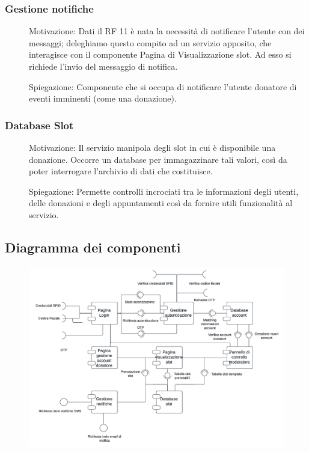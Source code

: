 \documentclass{article}
\begin{document}
\subsubsection{Gestione notifiche}
\begin{description}
	\item[] Motivazione: Dati il RF 11 è nata la necessità di notificare l'utente con dei messaggi; deleghiamo questo compito ad un servizio apposito, che interagisce con il componente Pagina di Visualizzazione slot. Ad esso si richiede l'invio del messaggio di notifica.
	\item[] Spiegazione: Componente che si occupa di notificare l'utente donatore di eventi imminenti (come una donazione).
\end{description}

\subsubsection{Database Slot}
\begin{description}
	\item[] Motivazione: Il servizio manipola degli slot in cui è disponibile una donazione. Occorre un database per immagazzinare tali valori, così da poter interrogare l'archivio di dati che costituisce.
	\item[] Spiegazione: Permette controlli incrociati tra le informazioni degli utenti, delle donazioni e degli appuntamenti così da fornire utili funzionalità al servizio.
\end{description}


\subsection{Diagramma dei componenti}
\begin{figure}[htp]
		\centering
		\includegraphics[width=\textwidth]{interface.png}
	\end{figure}
\end{document}
